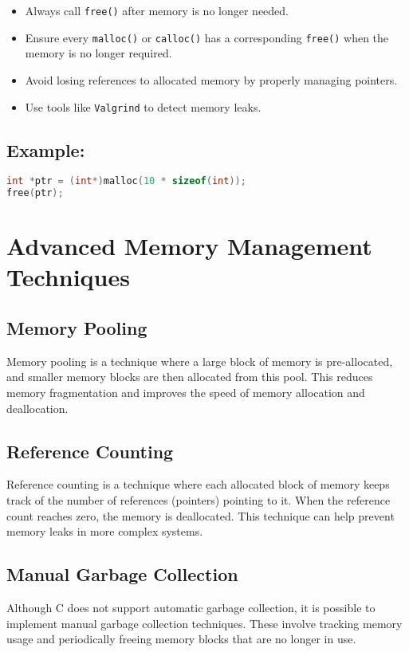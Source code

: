 \documentclass[a4paper,12pt]{article}
\begin{document}
\begin{itemize}
    \item Always call \texttt{free()} after memory is no longer needed.
    \item Ensure every \texttt{malloc()} or \texttt{calloc()} has a corresponding \texttt{free()} when the memory is no longer required.
    \item Avoid losing references to allocated memory by properly managing pointers.
    \item Use tools like \texttt{Valgrind} to detect memory leaks.
\end{itemize}

\subsection*{Example:}
\begin{lstlisting}[language=C]
int *ptr = (int*)malloc(10 * sizeof(int));
free(ptr); 
\end{lstlisting}

\section{Advanced Memory Management Techniques}
\subsection*{Memory Pooling}
Memory pooling is a technique where a large block of memory is pre-allocated, and smaller memory blocks are then allocated from this pool. This reduces memory fragmentation and improves the speed of memory allocation and deallocation.

\subsection*{Reference Counting}
Reference counting is a technique where each allocated block of memory keeps track of the number of references (pointers) pointing to it. When the reference count reaches zero, the memory is deallocated. This technique can help prevent memory leaks in more complex systems.

\subsection*{Manual Garbage Collection}
Although C does not support automatic garbage collection, it is possible to implement manual garbage collection techniques. These involve tracking memory usage and periodically freeing memory blocks that are no longer in use.
\end{document}
